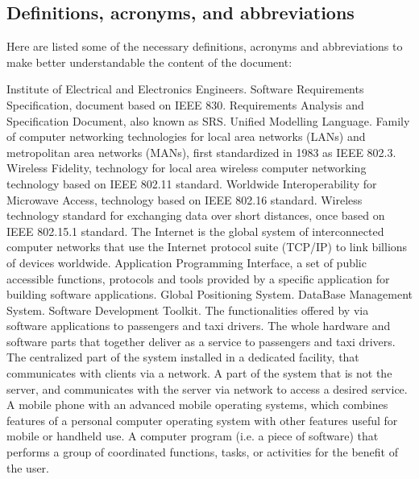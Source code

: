 \subsection{Definitions, acronyms, and abbreviations}
Here are listed some of the necessary definitions, acronyms and abbreviations to make better understandable the content of the document:
\begin{itemize}
	 Institute of Electrical and Electronics Engineers.
	 Software Requirements Specification, document based on IEEE 830.
	 Requirements Analysis and Specification Document, also known as SRS.
	 Unified Modelling Language.
	 Family of computer networking technologies for local area networks (LANs) and metropolitan area networks (MANs), first standardized in 1983 as IEEE 802.3.
	 Wireless Fidelity, technology for local area wireless computer networking technology based on IEEE 802.11 standard.
	 Worldwide Interoperability for Microwave Access, technology based on IEEE 802.16 standard.
	 Wireless technology standard for exchanging data over short distances, once based on IEEE 802.15.1 standard.
	 The Internet is the global system of interconnected computer networks that use the Internet protocol suite (TCP/IP) to link billions of devices worldwide.
	 Application Programming Interface, a set of public accessible functions, protocols and tools provided by a specific application for building software applications.
	 Global Positioning System.
	 DataBase Management System.
	 Software Development Toolkit.
	 The functionalities offered by \myTaxiService{} via software applications to passengers and taxi drivers.
	 The whole hardware and software parts that together deliver \myTaxiService{} as a service to passengers and taxi drivers.
	 The centralized part of the system installed in a dedicated facility, that communicates with clients via a network.
	 A part of the system that is not the server, and communicates with the server via network to access a desired service.
	 A mobile phone with an advanced mobile operating systems, which combines features of a personal computer operating system with other features useful for mobile or handheld use.
	 A computer program (i.e. a piece of software) that performs a group of coordinated functions, tasks, or activities for the benefit of the user.

\end{itemize}
